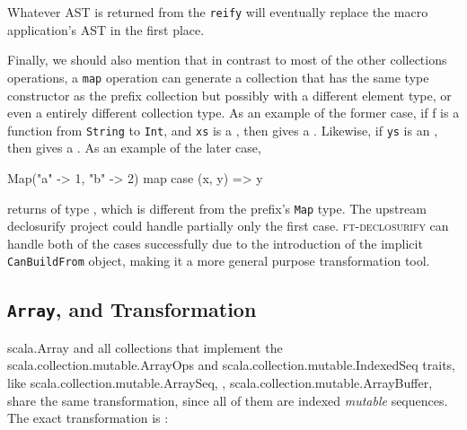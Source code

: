Whatever AST is returned from the \texttt{reify} will eventually replace the macro
application's AST in the first place.

Finally, we should also mention that in contrast to most of the other collections operations, 
a \texttt{map} operation can generate a collection that has the same type constructor as the prefix
collection but possibly with a different element type, or even a entirely
different collection type. As an example of the former case, if f is a function
from \texttt{String} to \texttt{Int}, and \texttt{xs} is a , then  gives a .
Likewise, if \texttt{ys} is an , then  gives a . As an
example of the later case,

\begin{scalaCode}
 Map("a" -> 1, "b" -> 2) map { case (x, y) => y}
\end{scalaCode}

returns  of type ,
which is different from the prefix's \texttt{Map} type. The upstream declosurify project
could handle partially only the first case. \textsc{ft-declosurify} can handle both of
the cases successfully due to the introduction of the implicit \texttt{CanBuildFrom}
object, making it a more general purpose transformation tool.


\subsection{\texttt{Array},   and
 Transformation}

scala.Array and all collections that implement the 
scala.\allowbreak{}collection.\allowbreak{}mutable.\allowbreak{}ArrayOps and scala.\allowbreak{}collection.\allowbreak{}mutable.\allowbreak{}IndexedSeq
traits, like scala.\allowbreak{}collection.\allowbreak{}mutable.\allowbreak{}ArraySeq,
 , 
scala.\allowbreak{}collection.\allowbreak{}mutable.\allowbreak{}ArrayBuffer,
share the same transformation, since all of them are indexed \emph{mutable}
sequences. The exact transformation is :

